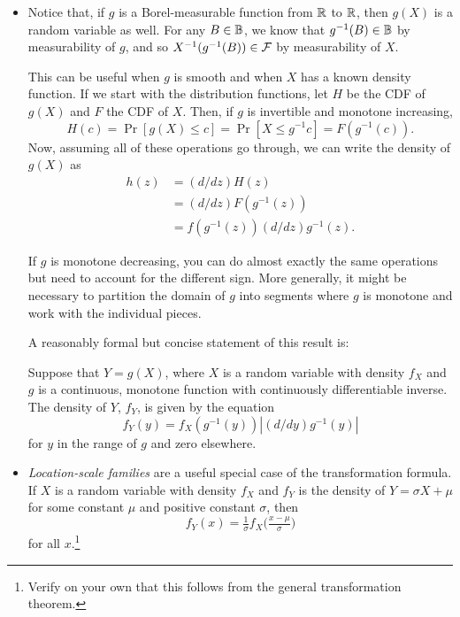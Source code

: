 \begin{itemize}[leftmargin=0pt]

\item Notice that, if $g$ is a Borel-measurable function from $\mathbb{R}$ to
  $\mathbb{R}$, then $g(X)$ is a random variable as well.  For any $B \in \mathbb{B}$,
  we know that $g^{-1}(B) \in \mathbb{B}$ by measurability of $g$, and so
  $X^{-1}(g^{-1}(B)) \in \mathcal{F}$ by measurability of $X$.

  This can be useful when $g$ is smooth and when $X$ has a known
  density function.  If we start with the distribution functions, let
  $H$ be the CDF of $g(X)$ and $F$ the CDF of $X$.  Then, if $g$ is
  invertible and monotone increasing,
  \begin{equation*}
    H(c) = \Pr[g(X) \leq c] = \Pr[X \leq g^{-1} c] = F(g^{-1}(c)).
  \end{equation*}
  Now, assuming all of these operations go through, we can write the
  density of $g(X)$ as
  \begin{align*}
    h(z) &= (d/dz) H(z) \\
    &= (d/dz) F(g^{-1}(z)) \\
    &= f(g^{-1}(z)) (d/dz) g^{-1}(z).
  \end{align*}

  If $g$ is monotone decreasing, you can do almost exactly the same
  operations but need to account for the different sign.  More
  generally, it might be necessary to partition the domain of $g$ into
  segments where $g$ is monotone and work with the individual pieces.

  A reasonably formal but concise statement of this result is:
  \begin{thm}
    Suppose that $Y = g(X)$, where $X$ is a random variable with density
    $f_X$ and $g$ is a continuous, monotone function with continuously
    differentiable inverse.  The density of $Y$, $f_Y$, is given by the
    equation
    \begin{equation}
      f_Y(y) = f_X(g^{-1}(y)) | (d/dy) g^{-1}(y) |
    \end{equation}
    for $y$ in the range of $g$ and zero elsewhere.
  \end{thm}

\item \emph{Location-scale families} are a useful special case of the
  transformation formula.  If $X$ is a random variable with density
  $f_X$ and $f_Y$ is the density of $Y = \sigma X + \mu$ for some constant
  $\mu$ and positive constant $\sigma$, then
  \begin{equation*}
    f_Y(x) = \tfrac{1}{\sigma} f_X\big( \tfrac{x - \mu}{\sigma} \big)
  \end{equation*}
  for all $x$.\footnote{Verify on your own that this follows from the
  general transformation theorem.}


\end{itemize}
